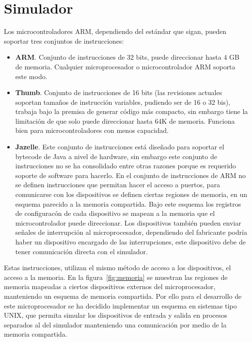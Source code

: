 \section{Simulador}
Los microcontroladores ARM, dependiendo del est\'andar que sigan, pueden soportar tres conjuntos de instrucciones:\medskip

\begin{itemize}
 \item \textbf{ARM}. Conjunto de instrucciones de 32 bits, puede direccionar hasta 4 GB de memoria. Cualquier microprocesador o microcontrolador ARM soporta este modo.
 \item \textbf{Thumb}. Conjunto de instrucciones de 16 bits (las revisiones actuales soportan tama\~nos de instrucci\'on variables, pudiendo ser de 16 o 32 bis), trabaja bajo la premisa de generar c\'odigo m\'as compacto, sin embargo tiene la limitación de que solo puede direccionar hasta 64K de memoria.  Funciona bien para microcontroladores con menos capacidad.
 \item \textbf{Jazelle}. Este conjunto de instrucciones est\'a dise\~nado para soportar el bytecode de Java a nivel de hardware, sin embargo este conjunto de instrucciones no se ha consolidado entre otras razones porque es requerido soporte de software para hacerlo. En el conjunto de instrucciones de ARM no se definen instrucciones que permitan hacer el acceso a puertos, para comunicarse con los dispositivos se definen ciertas regiones de memoria, en un esquema parecido a la memoria compartida. Bajo este esquema los registros de configurac\'on de cada dispositivo se mapean a la memoria que el microcontrolador puede direccionar. Los dispositivos tambi\'en pueden enviar se\~nales de interrupci\'on al microprocesador, dependiendo del fabricante podría haber un dispositivo encargado de las interrupciones, este dispositivo debe de tener comunicaci\'on directa con el simulador.
\end{itemize}
Estas instrucciones, utilizan el mismo m\'etodo de acceso a los dispositivos, el acceso a la memoria. En la figura~\ref{fig:memoria} se muestran las regiones de memoria mapeadas a ciertos dispositivos externos del microprocesador, manteniendo un esquema de memoria compartida\cite{Uhlig2007}. Por ello para el desarrollo de este microprocesador se ha decidido implementar un esquema en sistemas tipo UNIX, que permita simular los dispositivos de entrada y salida en procesos separados al del simulador manteniendo una comunicaci\'on por medio de la memoria compartida.\medskip

